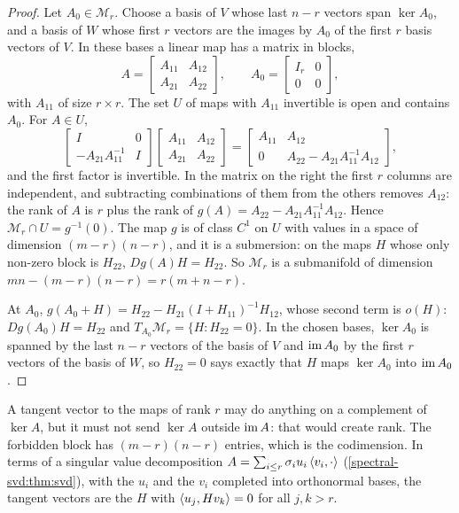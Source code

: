 \begin{notechapter}
\begin{proof}
Let $A_0\in\mathcal M_r$. Choose a basis of $V$ whose last $n - r$ vectors
span $\ker A_0$, and a basis of $W$ whose first $r$ vectors are the
images by $A_0$ of the first $r$ basis vectors of $V$. In these bases a
linear map has a matrix in blocks,
\[
  A = \begin{bmatrix} A_{11} & A_{12}\\ A_{21} & A_{22}\end{bmatrix},
  \qquad
  A_0 = \begin{bmatrix} I_r & 0\\ 0 & 0\end{bmatrix},
\]
with $A_{11}$ of size $r\times r$. The set $U$ of maps with $A_{11}$
invertible is open and contains $A_0$. For $A\in U$,
\[
  \begin{bmatrix} I & 0\\ -A_{21}A_{11}^{-1} & I\end{bmatrix}
  \begin{bmatrix} A_{11} & A_{12}\\ A_{21} & A_{22}\end{bmatrix}
  = \begin{bmatrix} A_{11} & A_{12}\\
      0 & A_{22} - A_{21}A_{11}^{-1}A_{12}\end{bmatrix} ,
\]
and the first factor is invertible. In the matrix on the right the first
$r$ columns are independent, and subtracting combinations of them from
the others removes $A_{12}$: the rank of $A$ is $r$ plus the rank of
$g(A) = A_{22} - A_{21}A_{11}^{-1}A_{12}$. Hence
$\mathcal M_r\cap U = g^{-1}(0)$. The map $g$ is of class $C^1$ on $U$
with values in a space of dimension $(m - r)(n - r)$, and it is a
submersion: on the maps $H$ whose only non-zero block is $H_{22}$,
$Dg(A)H = H_{22}$. So $\mathcal M_r$ is a submanifold of dimension
$mn - (m - r)(n - r) = r(m + n - r)$.

At $A_0$, $g(A_0 + H) = H_{22} - H_{21}(I + H_{11})^{-1}H_{12}$, whose
second term is $o(H)$: $Dg(A_0)H = H_{22}$ and
$T_{A_0}\mathcal M_r = \{H : H_{22} = 0\}$. In the chosen bases,
$\ker A_0$ is spanned by the last $n - r$ vectors of the basis of $V$ and
$\operatorname{im} A_0$ by the first $r$ vectors of the basis of $W$, so $H_{22} = 0$
says exactly that $H$ maps $\ker A_0$ into $\operatorname{im} A_0$.
\end{proof}

\begin{intuition}
A tangent vector to the maps of rank $r$ may do anything on a complement
of $\ker A$, but it must not send $\ker A$ outside $\operatorname{im} A$: that would
create rank. The forbidden block has $(m - r)(n - r)$ entries, which is
the codimension. In terms of a singular value decomposition
$A = \sum_{i\leq r}\sigma_iu_i\left\langle v_i, \cdot \right\rangle$
(\cref{spectral-svd:thm:svd}), with the $u_i$ and the $v_i$ completed
into orthonormal bases, the tangent vectors are the $H$ with
$\left\langle u_j, Hv_k \right\rangle = 0$ for all $j, k > r$.
\end{intuition}


\end{notechapter}
